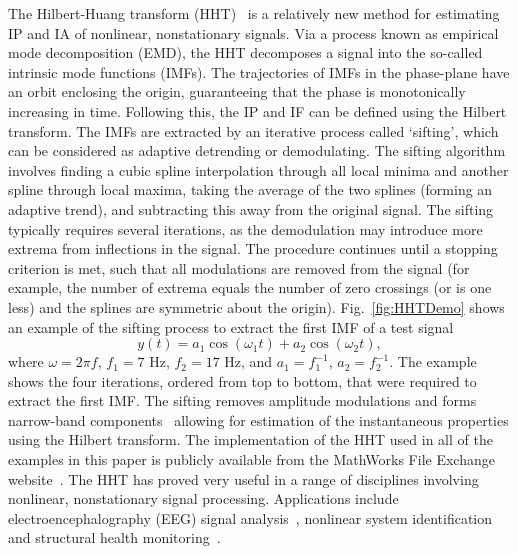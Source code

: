 \documentclass[journal,11pt,a4paper,onecolumn,draftcls]{IEEEtran}
\begin{document}
The Hilbert-Huang transform (HHT)~\cite{Huang1998} is a relatively new method for estimating IP and IA of nonlinear, nonstationary signals. Via a process known as empirical mode decomposition (EMD), the HHT decomposes a signal into the so-called intrinsic mode functions (IMFs). The trajectories of IMFs in the phase-plane have an orbit enclosing the origin, guaranteeing that the phase is monotonically increasing in time. Following this, the IP and IF can be defined using the Hilbert transform. The IMFs are extracted by an iterative process called `sifting', which can be considered as adaptive detrending or demodulating. The sifting algorithm involves finding a cubic spline interpolation through all local minima and another spline through local maxima, taking the average of the two splines (forming an adaptive trend), and subtracting this away from the original signal. The sifting typically requires several iterations, as the demodulation may introduce more extrema from inflections in the signal. The procedure continues until a stopping criterion is met, such that all modulations are removed from the signal (for example, the number of extrema equals the number of zero crossings (or is one less) and the splines are symmetric about the origin). Fig.~\ref{fig:HHTDemo} shows an example of the sifting process to extract the first IMF of a test signal
\begin{equation}\label{eq:FirstTestSig}
y\left( t \right) = a_1\cos \left(\omega_1t\right) + a_2\cos \left( \omega _2t \right),
\end{equation}
where $\omega = 2\pi f$, $f_1 = 7$ Hz, $f_2 = 17$ Hz, and $a_1 = f_1^{-1}$, $a_2=f_2^{-1}$. The example shows the four iterations, ordered from top to bottom, that were required to extract the first IMF. The sifting removes amplitude modulations and forms narrow-band components~\cite{Huang1998} allowing for estimation of the instantaneous properties using the Hilbert transform. The implementation of the HHT used in all of the examples in this paper is publicly available from the MathWorks File Exchange website~\cite{Tan2008}. The HHT has proved very useful in a range of disciplines involving nonlinear, nonstationary signal processing. Applications include electroencephalography (EEG) signal analysis~\cite{Wang2008}, nonlinear system identification and structural health monitoring~\cite{Pai2008}.
\end{document}
